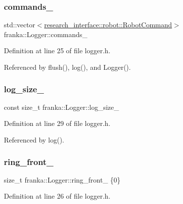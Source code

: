 \subsubsection{\texorpdfstring{commands\+\_\+}{commands\_}}
{\footnotesize\ttfamily std\+::vector$<$\hyperlink{structresearch__interface_1_1robot_1_1RobotCommand}{research\+\_\+interface\+::robot\+::\+Robot\+Command}$>$ franka\+::\+Logger\+::commands\+\_\+\hspace{0.3cm}{\ttfamily [private]}}



Definition at line 25 of file logger.\+h.



Referenced by flush(), log(), and Logger().

\mbox{\label{classfranka_1_1Logger_ac4d8294e724b3e1ada3ddbcdfc14e245}} 
\subsubsection{\texorpdfstring{log\+\_\+size\+\_\+}{log\_size\_}}
{\footnotesize\ttfamily const size\+\_\+t franka\+::\+Logger\+::log\+\_\+size\+\_\+\hspace{0.3cm}{\ttfamily [private]}}



Definition at line 29 of file logger.\+h.



Referenced by log().

\mbox{\label{classfranka_1_1Logger_ac8b62b201f384202b095b68babe0a8da}} 
\subsubsection{\texorpdfstring{ring\+\_\+front\+\_\+}{ring\_front\_}}
{\footnotesize\ttfamily size\+\_\+t franka\+::\+Logger\+::ring\+\_\+front\+\_\+ \{0\}\hspace{0.3cm}{\ttfamily [private]}}



Definition at line 26 of file logger.\+h.



